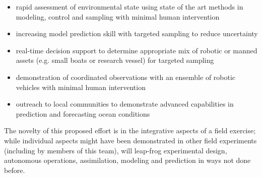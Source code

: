 \begin{itemize}

\item rapid assessment of environmental state using state of the art
  methods in modeling, control and sampling with minimal human
  intervention
  
\item increasing model prediction skill with targeted sampling to reduce
  uncertainty
  
\item real-time decision support to determine appropriate mix of robotic
  or manned assets (e.g. small boats or research vessel) for targeted
  sampling
  
\item demonstration of coordinated observations with an ensemble of
  robotic vehicles with minimal human intervention

\item outreach to local communities to demonstrate advanced
  capabilities in prediction and forecasting ocean conditions

\end{itemize}  

The novelty of this proposed effort is in the integrative aspects of a
field exercise; while individual aspects might have been demonstrated
in other field experiments (including by members of this team), \proj
will leap-frog experimental design, autonomous operations,
assimilation, modeling and prediction in ways not done before.

